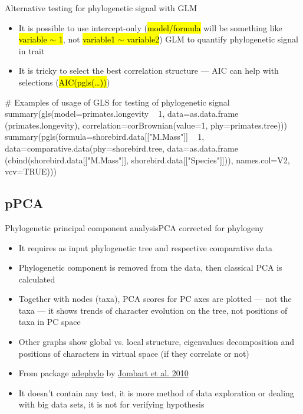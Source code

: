 \documentclass[compress, ucs, xelatex, 11pt, xcolor=svgnames,
	hyperref={
		bookmarks=true,
		unicode=true,
		colorlinks=true,
		pdftitle={Molecular data in R},
		plainpages=false,
		pdfauthor={Vojtech Zeisek},
		pdfsubject={Course about phylogeny and evolution in R},
		pdfcreator={XeLaTeX},
		pdfkeywords={R, evolution, phylogeny, molecular data},
		linkcolor=Tomato,
		anchorcolor=SaddleBrown,
		citecolor=Goldenrod,
		filecolor=DarkMagenta,
		menucolor=Sienna,
		urlcolor=DarkTurquoise,
		pdftex},
	url={hyphens, lowtilde} %
	]{beamer}
\renewcommand{\texttt}[1]{\hl{\ttfamily #1}}
\begin{document}
\begin{frame}[fragile]{Alternative testing for phylogenetic signal with GLM}
	\begin{itemize}
		\item It is possible to use intercept-only (\texttt{model/formula} will be something like \texttt{variable $\sim$ 1}, not \texttt{variable1 $\sim$ variable2}) GLM to quantify phylogenetic signal in trait
		\item It is tricky to select the best correlation structure --- AIC can help with selections (\texttt{AIC(pgls(\ldots))})
	\end{itemize}
	\begin{spluscode}
    # Examples of usage of GLS for testing of phylogenetic signal
    summary(gls(model=primates.longevity ~ 1, data=as.data.frame
      (primates.longevity), correlation=corBrownian(value=1,
      phy=primates.tree)))
    summary(pgls(formula=shorebird.data[["M.Mass"]] ~ 1,
      data=comparative.data(phy=shorebird.tree, data=as.data.frame
      (cbind(shorebird.data[["M.Mass"]], shorebird.data[["Species"]])),
      names.col=V2, vcv=TRUE)))
	\end{spluscode}
\end{frame}

\subsection{pPCA}

\begin{frame}{Phylogenetic principal component analysis}{PCA corrected for phylogeny}
	\begin{itemize}
		\item It requires as input phylogenetic tree and respective comparative data
		\item Phylogenetic component is removed from the data, then classical PCA is calculated
		\item Together with nodes (taxa), PCA scores for PC axes are plotted --- not the taxa --- it shows trends of character evolution on the tree, not positions of taxa in PC space
		\item Other graphs show global vs. local structure, eigenvalues decomposition and positions of characters in virtual space (if they correlate or not)
		\item From package \href{https://academic.oup.com/bioinformatics/article/26/15/1907/188748}{adephylo} by \href{https://www.sciencedirect.com/science/article/pii/S0022519310001736}{Jombart et al. 2010}
		\item It doesn't contain any test, it is more method of data exploration or dealing with big data sets, it is not for verifying hypothesis
	\end{itemize}
\end{frame}
\end{document}
